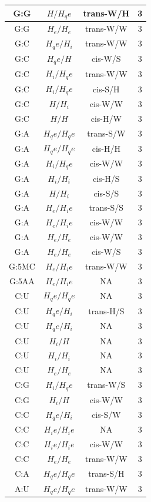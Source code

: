\begin{center}
\begin{longtable}{c|c|c|c}
G:G & $H/H_qe$ & trans-W/H & 3 \\  \hline
G:G & $H_e/H_e$ & trans-W/W & 3 \\  \hline
G:C & $H_qe/H_i$ & trans-W/W & 3 \\  \hline
G:C & $H_qe/H$ & cis-W/S & 3 \\  \hline
G:C & $H_i/H_qe$ & trans-W/W & 3 \\  \hline
G:C & $H_i/H_qe$ & cis-S/H & 3 \\  \hline
G:C & $H/H_i$ & cis-W/W & 3 \\  \hline
G:C & $H/H$ & cis-H/W & 3 \\  \hline
G:A & $H_qe/H_qe$ & trans-S/W & 3 \\  \hline
G:A & $H_qe/H_qe$ & cis-H/H & 3 \\  \hline
G:A & $H_i/H_qe$ & cis-W/W & 3 \\  \hline
G:A & $H_i/H_i$ & cis-H/S & 3 \\  \hline
G:A & $H/H_i$ & cis-S/S & 3 \\  \hline
G:A & $H_e/H_ie$ & trans-S/S & 3 \\  \hline
G:A & $H_e/H_ie$ & cis-W/W & 3 \\  \hline
G:A & $H_e/H_e$ & cis-W/W & 3 \\  \hline
G:A & $H_e/H_e$ & cis-W/S & 3 \\  \hline
G:5MC & $H_e/H_ie$ & trans-W/W & 3 \\  \hline
G:5AA & $H_e/H_ie$ & NA & 3 \\  \hline
C:U & $H_qe/H_qe$ & NA & 3 \\  \hline
C:U & $H_qe/H_i$ & trans-H/S & 3 \\  \hline
C:U & $H_qe/H_i$ & NA & 3 \\  \hline
C:U & $H_i/H$ & NA & 3 \\  \hline
C:U & $H_i/H_i$ & NA & 3 \\  \hline
C:U & $H_e/H_e$ & NA & 3 \\  \hline
C:G & $H_i/H_qe$ & trans-W/S & 3 \\  \hline
C:G & $H_i/H$ & cis-W/W & 3 \\  \hline
C:C & $H_qe/H_i$ & cis-S/W & 3 \\  \hline
C:C & $H_ie/H_ie$ & NA & 3 \\  \hline
C:C & $H_ie/H_ie$ & cis-W/W & 3 \\  \hline
C:C & $H_e/H_e$ & trans-W/W & 3 \\  \hline
C:A & $H_qe/H_qe$ & trans-S/H & 3 \\  \hline
A:U & $H_qe/H_qe$ & trans-W/W & 3 \\  \hline

\end{longtable}
\end{center}
